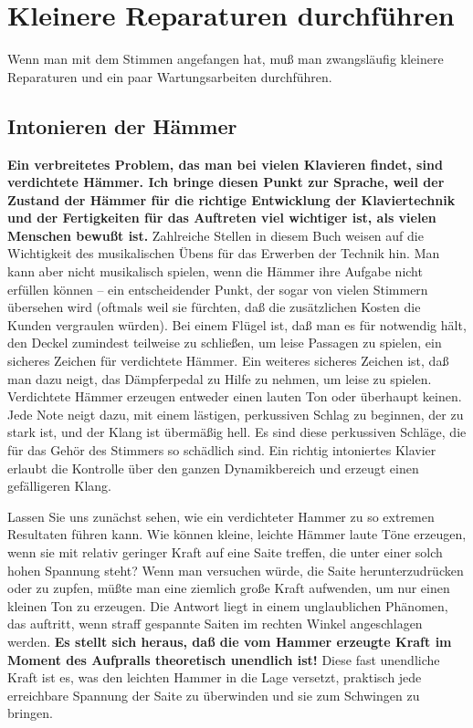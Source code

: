 
\section{Kleinere Reparaturen durchführen}
\label{c2_7}

Wenn man mit dem Stimmen angefangen hat, muß man zwangsläufig kleinere Reparaturen und ein paar Wartungsarbeiten durchführen.
 

\label{c2_7a}
\subsection{Intonieren der Hämmer}
\label{c2_7_hamm}

\textbf{Ein verbreitetes Problem, das man bei vielen Klavieren findet, sind verdichtete Hämmer.
Ich bringe diesen Punkt zur Sprache, weil der Zustand der Hämmer für die richtige Entwicklung der Klaviertechnik und der Fertigkeiten für das Auftreten viel wichtiger ist, als vielen Menschen bewußt ist.}
Zahlreiche Stellen in diesem Buch weisen auf die Wichtigkeit des musikalischen Übens für das Erwerben der Technik hin.
Man kann aber nicht musikalisch spielen, wenn die Hämmer ihre Aufgabe nicht erfüllen können -- ein entscheidender Punkt, der sogar von vielen Stimmern übersehen wird (oftmals weil sie fürchten, daß die zusätzlichen Kosten die Kunden vergraulen würden).
Bei einem Flügel ist, daß man es für notwendig hält, den Deckel zumindest teilweise zu schließen, um leise Passagen zu spielen, ein sicheres Zeichen für verdichtete Hämmer.
Ein weiteres sicheres Zeichen ist, daß man dazu neigt, das Dämpferpedal zu Hilfe zu nehmen, um leise zu spielen.
Verdichtete Hämmer erzeugen entweder einen lauten Ton oder überhaupt keinen.
Jede Note neigt dazu, mit einem lästigen, perkussiven Schlag zu beginnen, der zu stark ist, und der Klang ist übermäßig hell.
Es sind diese perkussiven Schläge, die für das Gehör des Stimmers so schädlich sind.
Ein richtig intoniertes Klavier erlaubt die Kontrolle über den ganzen Dynamikbereich und erzeugt einen gefälligeren Klang.

Lassen Sie uns zunächst sehen, wie ein verdichteter Hammer zu so extremen Resultaten führen kann.
Wie können kleine, leichte Hämmer laute Töne erzeugen, wenn sie mit relativ geringer Kraft auf eine Saite treffen, die unter einer solch hohen Spannung steht?
Wenn man versuchen würde, die Saite herunterzudrücken oder zu zupfen, müßte man eine ziemlich große Kraft aufwenden, um nur einen kleinen Ton zu erzeugen.
Die Antwort liegt in einem unglaublichen Phänomen, das auftritt, wenn straff gespannte Saiten im rechten Winkel angeschlagen werden.
\textbf{Es stellt sich heraus, daß die vom Hammer erzeugte Kraft im Moment des Aufpralls theoretisch unendlich ist!}
Diese fast unendliche Kraft ist es, was den leichten Hammer in die Lage versetzt, praktisch jede erreichbare Spannung der Saite zu überwinden und sie zum Schwingen zu bringen.

